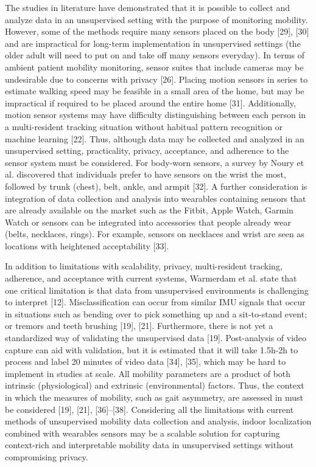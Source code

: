 The studies in literature have demonstrated that it is possible to collect and analyze data in an 
unsupervised setting with the purpose of monitoring mobility. However, some of the methods require 
many sensors placed on the body [29], [30] and are impractical for long-term implementation in 
unsupervised settings (the older adult will need to put on and take off many sensors everyday). 
In terms of ambient patient mobility monitoring, sensor suites that include cameras may be undesirable 
due to concerns with privacy [26]. Placing motion sensors in series to estimate walking speed may be 
feasible in a small area of the home, but may be impractical if required to be placed around the entire 
home [31]. Additionally, motion sensor systems may have difficulty distinguishing between each person 
in a multi-resident tracking situation without habitual pattern recognition or machine learning [22]. 
Thus, although data may be collected and analyzed in an unsupervised setting, practicality, privacy, 
acceptance, and adherence to the sensor system must be considered. For body-worn sensors, a survey 
by Noury et al. discovered that individuals prefer to have sensors on the wrist the most, followed by 
trunk (chest), belt, ankle, and armpit [32].  A further consideration is integration of data collection 
and analysis into wearables containing sensors that are already available on the market such as the 
Fitbit, Apple Watch, Garmin Watch or sensors can be integrated into accessories that people already 
wear (belts, necklaces, rings). For example, sensors on necklaces and wrist are seen as locations with 
heightened acceptability [33].

In addition to limitations with scalability, privacy, multi-resident tracking, adherence, and 
acceptance with current systems, Warmerdam et al. state that one critical limitation is that 
data from unsupervised environments is challenging to interpret [12]. Misclassification can 
occur from similar IMU signals that occur in situations such as bending over to pick something 
up and a sit-to-stand event; or tremors and teeth brushing [19], [21]. Furthermore, there is not 
yet a standardized way of validating the unsupervised data [19]. Post-analysis of video capture 
can aid with validation, but it is estimated that it will take 1.5h-2h to process and label 
20 minutes of video data [34], [35], which may be hard to implement in studies at scale. All 
mobility parameters are a product of both intrinsic (physiological) and extrinsic (environmental) 
factors. Thus, the context in which the measures of mobility, such as gait asymmetry, are 
assessed in must be considered [19], [21], [36]–[38]. Considering all the limitations with 
current methods of unsupervised mobility data collection and analysis, indoor localization 
combined with wearables sensors may be a scalable solution for capturing context-rich and 
interpretable mobility data in unsupervised settings without compromising privacy.

